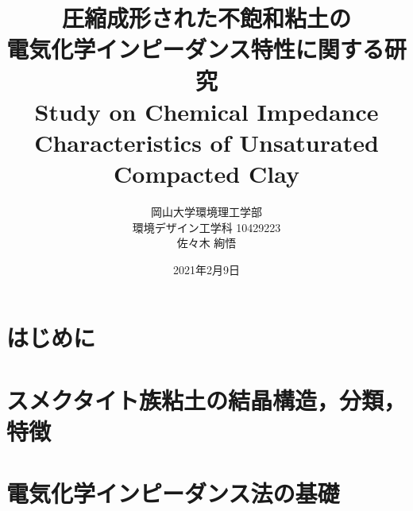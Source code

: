 \documentclass[11pt,a4j]{mybook2}
\title{
\vspace{20mm}
圧縮成形された不飽和粘土の\\
電気化学インピーダンス特性に関する研究
\\
\vspace{5mm}
Study on Chemical Impedance Characteristics 
of Unsaturated Compacted Clay
\vspace{60mm}
}
\date{2021年2月9日}
\author{
	\vspace{40mm}
岡山大学環境理工学部\\
環境デザイン工学科 10429223\\
	佐々木 絢悟}
\begin{document}
\maketitle
\tableofcontents
\frontmatter
\mainmatter
\chapter{はじめに}
	
\chapter{スメクタイト族粘土の結晶構造，分類，特徴}
	
\chapter{電気化学インピーダンス法の基礎}
	
\end{document}
